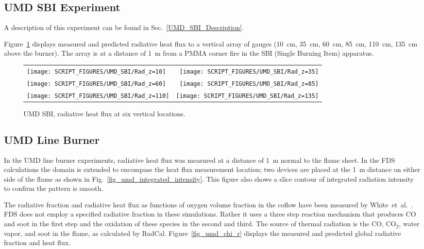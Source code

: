 \clearpage

\subsection{UMD SBI Experiment}

A description of this experiment can be found in Sec.~\ref{UMD_SBI_Description}.

Figure~\ref{UMD_SBI_Rad} displays measured and predicted radiative heat flux to a vertical array of gauges (10~cm, 35~cm, 60~cm, 85~cm, 110~cm, 135~cm above the burner). The array is at a distance of 1~m from a PMMA corner fire in the SBI (Single Burning Item) apparatus.

\begin{figure}[h!]
\begin{tabular*}{\textwidth}{l@{\extracolsep{\fill}}r}
\texttt{[image: SCRIPT\_FIGURES/UMD\_SBI/Rad\_z=10]} &
\texttt{[image: SCRIPT\_FIGURES/UMD\_SBI/Rad\_z=35]} \\
\texttt{[image: SCRIPT\_FIGURES/UMD\_SBI/Rad\_z=60]} &
\texttt{[image: SCRIPT\_FIGURES/UMD\_SBI/Rad\_z=85]} \\
\texttt{[image: SCRIPT\_FIGURES/UMD\_SBI/Rad\_z=110]} &
\texttt{[image: SCRIPT\_FIGURES/UMD\_SBI/Rad\_z=135]}
\end{tabular*}
\caption[UMD SBI, radiative heat flux at six vertical locations]
{UMD SBI, radiative heat flux at six vertical locations.}
\label{UMD_SBI_Rad}
\end{figure}

\clearpage

\subsection{UMD Line Burner}

In the UMD line burner experiments, radiative heat flux was measured at a distance of 1~m normal to the flame sheet.  In the FDS calculations the domain is extended to encompass the heat flux measurement location; two devices are placed at the 1~m distance on either side of the flame as shown in Fig.~\ref{fig_umd_integrated_intensity}. This figure also shows a slice contour of integrated radiation intensity to confirm the pattern is smooth.

The radiative fraction and radiative heat flux as functions of oxygen volume fraction in the coflow have been measured by White~et~al.~\cite{White:2015}.  FDS does not employ a specified radiative fraction in these simulations. Rather it uses a three step reaction mechanism that produces CO and soot in the first step and the oxidation of these species in the second and third. The source of thermal radiation is the CO, CO$_2$, water vapor, and soot in the flame, as calculated by RadCal. Figure~\ref{fig_umd_chi_r} displays the measured and predicted global radiative fraction and heat flux.

